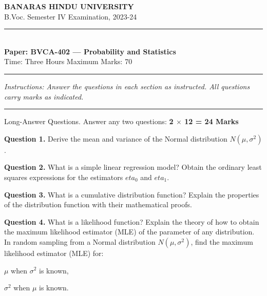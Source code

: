 \documentclass[11pt,a4paper]{article}
\begin{document}
\begin{center}
  {\large\bfseries BANARAS HINDU UNIVERSITY}\\[2pt]
  {
\normalsize B.Voc. Semester IV Examination, 2023-24}\\[6pt]
  \rule{0.8\linewidth}{0.5pt}\\[6pt]
  {\large\bfseries Paper: BVCA-402 --- Probability and Statistics}\\[4pt]
  {
\normalsize Time: Three Hours \hfill Maximum Marks: 70}
\end{center}

\rule{\linewidth}{0.4pt}

\smallskip



\noindent   \textit{Instructions: Answer the questions in each section as instructed. All questions carry marks as indicated.}

\bigskip




\rule{\linewidth}{0.4pt}\smallskip

Long-Answer Questions. Answer any two questions: \hfill   \textbf{2 $ \times$ 12 = 24 Marks}

\medskip



\noindent   \textbf{Question 1.} Derive the mean and variance of the Normal distribution $N(\mu, \sigma^2)$.

\medskip



\noindent   \textbf{Question 2.} What is a simple linear regression model? Obtain the ordinary least squares expressions for the estimators $eta_0$ and $eta_1$.

\medskip



\noindent   \textbf{Question 3.} What is a cumulative distribution function? Explain the properties of the distribution function with their mathematical proofs.

\medskip



\noindent   \textbf{Question 4.} What is a likelihood function? Explain the theory of how to obtain the maximum likelihood estimator (MLE) of the parameter of any distribution. In random sampling from a Normal distribution $N(\mu, \sigma^2)$, find the maximum likelihood estimator (MLE) for:

\begin{parts}
  \item $\mu$ when $\sigma^2$ is known,
  \item $\sigma^2$ when $\mu$ is known.
\end{parts}
\end{document}
